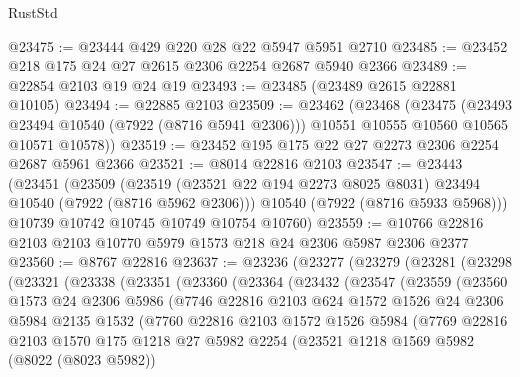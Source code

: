 \begin{lexlean}{RustStd}
\begin{coremodule}
@23475 := @23444 @429 @220 @28 @22 @5947 @5951 @2710
@23485 := @23452 @218 @175 @24 @27 @2615 @2306 @2254 @2687 @5940 @2366
@23489 := @22854 @2103 @19 @24 @19
@23493 := @23485 (@23489 @2615 @22881 @10105)
@23494 := @22885 @2103
@23509 := @23462
    (@23468
      (@23475
        (@23493 @23494 @10540 (@7922 (@8716 @5941 @2306)))
        @10551
        @10555
        @10560
        @10565
        @10571
        @10578))
@23519 := @23452 @195 @175 @22 @27 @2273 @2306 @2254 @2687 @5961 @2366
@23521 := @8014 @22816 @2103
@23547 := @23443
    (@23451
      (@23509
        (@23519 (@23521 @22 @194 @2273 @8025 @8031) @23494 @10540 (@7922 (@8716 @5962 @2306)))
        @10540
        (@7922 (@8716 @5933 @5968)))
      @10739
      @10742
      @10745
      @10749
      @10754
      @10760)
@23559 := @10766 @22816 @2103 @2103 @10770 @5979 @1573 @218 @24 @2306 @5987 @2306 @2377
@23560 := @8767 @22816
@23637 := @23236
    (@23277
      (@23279
        (@23281
          (@23298
            (@23321
              (@23338
                (@23351
                  (@23360
                    (@23364
                      (@23432
                        (@23547
                          (@23559
                            (@23560
                              @1573
                              @24
                              @2306
                              @5986
                              (@7746
                                @22816
                                @2103
                                @624
                                @1572
                                @1526
                                @24
                                @2306
                                @5984
                                @2135
                                @1532
                                (@7760
                                  @22816
                                  @2103
                                  @1572
                                  @1526
                                  @5984
                                  (@7769
                                    @22816
                                    @2103
                                    @1570
                                    @175
                                    @1218
                                    @27
                                    @5982
                                    @2254
                                    (@23521
                                      @1218
                                      @1569
                                      @5982
                                      (@8022 (@8023 @5982))

\end{coremodule}
\end{lexlean}
